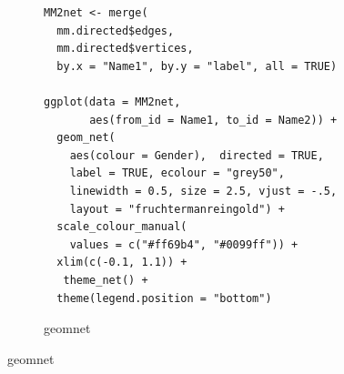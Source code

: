 \begin{figure}[hbtp]
\begin{subfigure}[t]{\textwidth}
\begin{adjustbox}{valign=t}
\begin{minipage}{.49\textwidth}
                          \end{minipage}

                          \end{adjustbox}
\end{subfigure}
%
\begin{subfigure}[t]{\textwidth}
\caption{geomnet}
\vspace{1em}

             \begin{adjustbox}{valign=t}

             \begin{minipage}{.49\textwidth}
 \begin{knitrout}\footnotesize
{}\color{fgcolor}\begin{kframe}
\begin{verbatim}
MM2net <- merge(
  mm.directed$edges,
  mm.directed$vertices,
  by.x = "Name1", by.y = "label", all = TRUE)

ggplot(data = MM2net,
       aes(from_id = Name1, to_id = Name2)) +
  geom_net(
    aes(colour = Gender),  directed = TRUE,
    label = TRUE, ecolour = "grey50",
    linewidth = 0.5, size = 2.5, vjust = -.5,
    layout = "fruchtermanreingold") +
  scale_colour_manual(
    values = c("#ff69b4", "#0099ff")) +
  xlim(c(-0.1, 1.1)) +
   theme_net() +
  theme(legend.position = "bottom")
\end{verbatim}
\end{kframe}
\end{knitrout} \vspace{1em}

                   \end{minipage}

                  \begin{minipage}{.49\textwidth}


\end{minipage}
\end{adjustbox}
\end{subfigure}
\end{figure}
